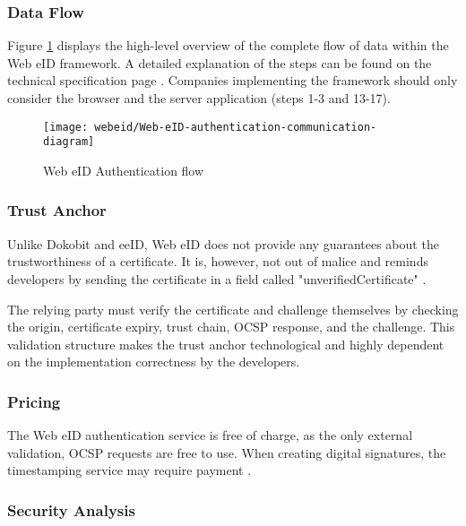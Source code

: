 \subsubsection{Data Flow}

Figure \ref{fig:web-eid-authentication} displays the high-level overview of the complete flow of data within the Web eID framework. A detailed explanation of the steps can be found on the technical specification page \cite{ria-webeid-systemarchitecture}. Companies implementing the framework should only consider the browser and the server application (steps 1-3 and 13-17).

\begin{figure}
  \centering
  \texttt{[image: webeid/Web-eID-authentication-communication-diagram]}
  \caption{Web eID Authentication flow \cite{ria-webeid-systemarchitecture}}
  \label{fig:web-eid-authentication}
\end{figure}

\subsubsection{Trust Anchor}

Unlike Dokobit and eeID, Web eID does not provide any guarantees about the trustworthiness of a certificate. It is, however, not out of malice and reminds developers by sending the certificate in a field called "unverifiedCertificate" \cite{ria-webeid-source-web-eid-authtoken-validation-java-readme}.

The relying party must verify the certificate and challenge themselves by checking the origin, certificate expiry, trust chain, OCSP response, and the challenge. This validation structure makes the trust anchor technological and highly dependent on the implementation correctness by the developers.


\subsubsection{Pricing}

The Web eID authentication service is free of charge, as the only external validation, OCSP \cite{rfc6960} requests are free to use. When creating digital signatures, the timestamping service may require payment \cite{ria-webeid-source-web-eid-authtoken-validation-java-readme}.

\subsubsection{Security Analysis}

